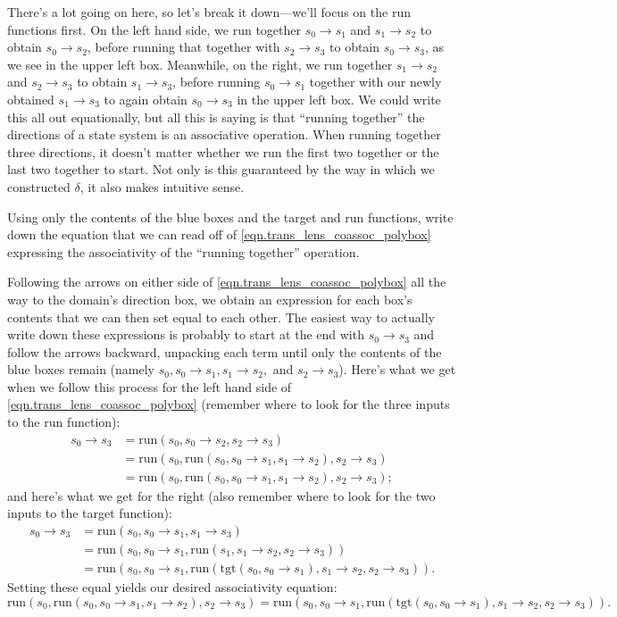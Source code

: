 \documentclass[Book-Poly]{subfiles}
\begin{document}
There's a lot going on here, so let's break it down---we'll focus on the run functions first.
On the left hand side, we run together $s_0\to s_1$ and $s_1\to s_2$ to obtain $s_0\to s_2$, before running that together with $s_2\to s_3$ to obtain $s_0\to s_3$, as we see in the upper left box.
Meanwhile, on the right, we run together $s_1\to s_2$ and $s_2\to s_3$ to obtain $s_1\to s_3$, before running $s_0\to s_1$ together with our newly obtained $s_1\to s_3$ to again obtain $s_0\to s_3$ in the upper left box.
We could write this all out equationally, but all this is saying is that ``running together'' the directions of a state system is an associative operation.
When running together three directions, it doesn't matter whether we run the first two together or the last two together to start.
Not only is this guaranteed by the way in which we constructed $\delta$, it also makes intuitive sense.

\begin{exercise}
Using only the contents of the blue boxes and the target and run functions, write down the equation that we can read off of \eqref{eqn.trans_lens_coassoc_polybox} expressing the associativity of the ``running together'' operation.
\begin{solution}
Following the arrows on either side of \eqref{eqn.trans_lens_coassoc_polybox} all the way to the domain's direction box, we obtain an expression for each box's contents that we can then set equal to each other.
The easiest way to actually write down these expressions is probably to start at the end with $s_0\to s_3$ and follow the arrows backward, unpacking each term until only the contents of the blue boxes remain (namely $s_0, s_0\to s_1, s_1\to s_2,$ and $s_2\to s_3$).
Here's what we get when we follow this process for the left hand side of \eqref{eqn.trans_lens_coassoc_polybox} (remember where to look for the three inputs to the run function):
\begin{align*}
    s_0\to s_3&=\text{run}(s_0,s_0\to s_2,s_2\to s_3)\\
    &=\text{run}(s_0,\text{run}(s_0,s_0\to s_1,s_1\to s_2),s_2\to s_3)\\
    &=\text{run}(s_0,\text{run}(s_0,s_0\to s_1,s_1\to s_2),s_2\to s_3);
\end{align*}
and here's what we get for the right (also remember where to look for the two inputs to the target function):
\begin{align*}
    s_0\to s_3&=\text{run}(s_0,s_0\to s_1,s_1\to s_3)\\
    &=\text{run}(s_0,s_0\to s_1,\text{run}(s_1,s_1\to s_2,s_2\to s_3))\\
    &=\text{run}(s_0,s_0\to s_1,\text{run}(\text{tgt}(s_0,s_0\to s_1),s_1\to s_2,s_2\to s_3)).
\end{align*}
Setting these equal yields our desired associativity equation:
\[
    \text{run}(s_0,\text{run}(s_0,s_0\to s_1,s_1\to s_2),s_2\to s_3)=\text{run}(s_0,s_0\to s_1,\text{run}(\text{tgt}(s_0,s_0\to s_1),s_1\to s_2,s_2\to s_3)).
\]
\end{solution}
\end{exercise}
\end{document}
